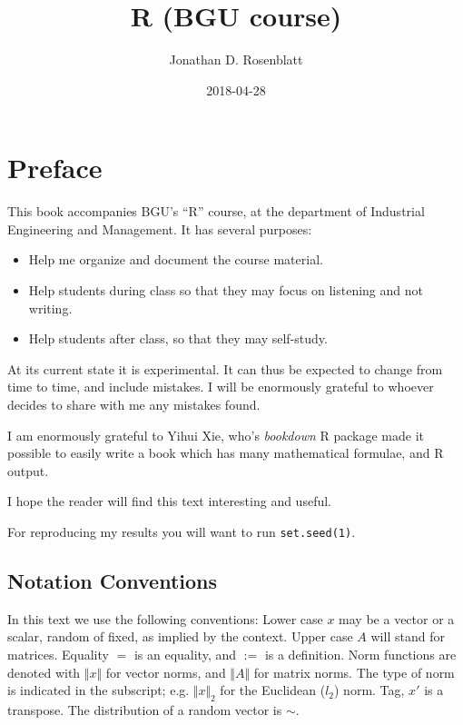 \documentclass[]{book}
\title{R (BGU course)}
\author{Jonathan D. Rosenblatt}
\date{2018-04-28}
\providecommand{\tightlist}{%
  \setlength{\itemsep}{0pt}\setlength{\parskip}{0pt}}
\theoremstyle{definition}
\theoremstyle{definition}
\theoremstyle{definition}
\theoremstyle{remark}
\begin{document}
\maketitle

{
\setcounter{tocdepth}{1}
\tableofcontents
}
\chapter{Preface}\label{preface}

This book accompanies BGU's ``R'' course, at the department of
Industrial Engineering and Management. It has several purposes:

\begin{itemize}
\tightlist
\item
  Help me organize and document the course material.
\item
  Help students during class so that they may focus on listening and not
  writing.
\item
  Help students after class, so that they may self-study.
\end{itemize}

At its current state it is experimental. It can thus be expected to
change from time to time, and include mistakes. I will be enormously
grateful to whoever decides to share with me any mistakes found.

I am enormously grateful to Yihui Xie, who's \emph{bookdown} R package
made it possible to easily write a book which has many mathematical
formulae, and R output.

I hope the reader will find this text interesting and useful.

For reproducing my results you will want to run \texttt{set.seed(1)}.

\section{Notation Conventions}\label{notation-conventions}

In this text we use the following conventions: Lower case \(x\) may be a
vector or a scalar, random of fixed, as implied by the context. Upper
case \(A\) will stand for matrices. Equality \(=\) is an equality, and
\(:=\) is a definition. Norm functions are denoted with
\(\Vert x \Vert\) for vector norms, and \(\Vert A \Vert\) for matrix
norms. The type of norm is indicated in the subscript; e.g.
\(\Vert x \Vert_2\) for the Euclidean (\(l_2\)) norm. Tag, \(x'\) is a
transpose. The distribution of a random vector is \(\sim\).
\end{document}
